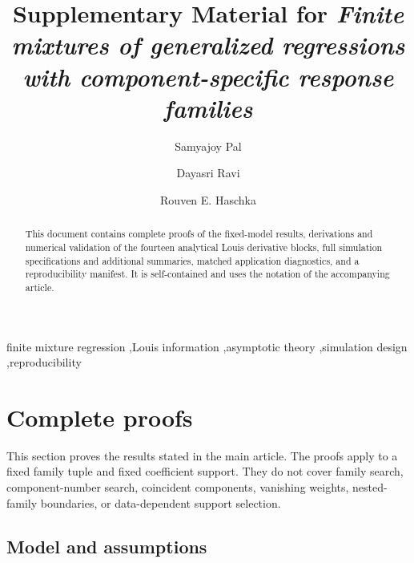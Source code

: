 \documentclass[a4paper,fleqn]{cas-sc}
\numberwithin{equation}{section}
\begin{document}
\let\WriteBookmarks\relax
\def\floatpagepagefraction{1}
\def\textpagefraction{.001}

\title[mode=title]{Supplementary Material for \textit{Finite mixtures of generalized regressions with component-specific response families}}

\author[1]{Samyajoy Pal}
\cormark[1]
\author[2]{Dayasri Ravi}
\author[1]{Rouven E. Haschka}

\begin{abstract}
This document contains complete proofs of the fixed-model results, derivations and numerical validation of the fourteen analytical Louis derivative blocks, full simulation specifications and additional summaries, matched application diagnostics, and a reproducibility manifest. It is self-contained and uses the notation of the accompanying article.
\end{abstract}

\begin{keywords}
finite mixture regression \sep Louis information \sep asymptotic theory \sep simulation design \sep reproducibility
\end{keywords}

\maketitle

\section{Complete proofs}
\label{supp:proofs}

This section proves the results stated in the main article. The proofs apply to a fixed family tuple and fixed coefficient support. They do not cover family search, component-number search, coincident components, vanishing weights, nested-family boundaries, or data-dependent support selection.

\subsection{Model and assumptions}
\end{document}
